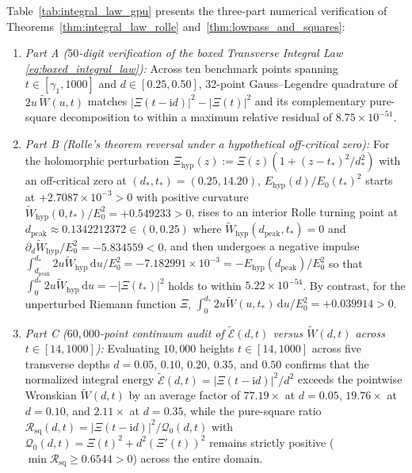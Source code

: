 \documentclass[11pt,a4paper,reqno]{amsart}
\theoremstyle{definition}
\theoremstyle{remark}
\numberwithin{equation}{section}
\newcommand{\dd}{\mathrm{d}}
\newcommand{\ii}{\mathrm{i}}
\newcommand{\Wtil}{\widetilde{W}}
\newcommand{\Etil}{\widetilde{\mathcal{E}}}
\begin{document}
Table~\ref{tab:integral_law_gpu} presents the three-part numerical verification of Theorems~\ref{thm:integral_law_rolle} and~\ref{thm:lowpass_and_squares}:
\begin{enumerate}
\item \emph{Part A ($50$-digit verification of the boxed Transverse Integral Law \eqref{eq:boxed_integral_law}):} Across ten benchmark points spanning $t \in [\gamma_1, 1000]$ and $d \in [0.25, 0.50]$, 32-point Gauss--Legendre quadrature of $2u\,\Wtil(u,t)$ matches $|\Xi(t-\ii d)|^2 - |\Xi(t)|^2$ and its complementary pure-square decomposition to within a maximum relative residual of $8.75 \times 10^{-51}$.
\item \emph{Part B (Rolle's theorem reversal under a hypothetical off-critical zero):} For the holomorphic perturbation $\Xi_{\mathrm{hyp}}(z) := \Xi(z)(1 + (z - t_*)^2/d_*^2)$ with an off-critical zero at $(d_*, t_*) = (0.25, 14.20)$, $E_{\mathrm{hyp}}(d)/E_0(t_*)^2$ starts at $+2.7087 \times 10^{-3} > 0$ with positive curvature $\Wtil_{\mathrm{hyp}}(0,t_*)/E_0^2 = +0.549233 > 0$, rises to an interior Rolle turning point at $d_{\mathrm{peak}} \approx 0.1342212372 \in (0, 0.25)$ where $\Wtil_{\mathrm{hyp}}(d_{\mathrm{peak}}, t_*) = 0$ and $\partial_d\Wtil_{\mathrm{hyp}}/E_0^2 = -5.834559 < 0$, and then undergoes a negative impulse $\int_{d_{\mathrm{peak}}}^{d_*} 2u\Wtil_{\mathrm{hyp}}\,\dd u / E_0^2 = -7.182991 \times 10^{-3} = -E_{\mathrm{hyp}}(d_{\mathrm{peak}})/E_0^2$ so that $\int_0^{d_*} 2u\Wtil_{\mathrm{hyp}}\,\dd u = -|\Xi(t_*)|^2$ holds to within $5.22 \times 10^{-54}$. By contrast, for the unperturbed Riemann function $\Xi$, $\int_0^{d_*} 2u\Wtil(u,t_*)\,\dd u / E_0^2 = +0.039914 > 0$.
\item \emph{Part C ($60{,}000$-point continuum audit of $\Etil(d,t)$ versus $\Wtil(d,t)$ across $t \in [14, 1000]$):} Evaluating $10{,}000$ heights $t \in [14, 1000]$ across five transverse depths $d = 0.05$, $0.10$, $0.20$, $0.35$, and $0.50$ confirms that the normalized integral energy $\Etil(d,t) = |\Xi(t-\ii d)|^2/d^2$ exceeds the pointwise Wronskian $\Wtil(d,t)$ by an average factor of $77.19\times$ at $d = 0.05$, $19.76\times$ at $d = 0.10$, and $2.11\times$ at $d = 0.35$, while the pure-square ratio $\mathcal{R}_{\mathrm{sq}}(d,t) = |\Xi(t-\ii d)|^2 / \mathcal{Q}_0(d,t)$ with $\mathcal{Q}_0(d,t) = \Xi(t)^2 + d^2(\Xi'(t))^2$ remains strictly positive ($\min \mathcal{R}_{\mathrm{sq}} \ge 0.6544 > 0$) across the entire domain.
\end{enumerate}
\end{document}
